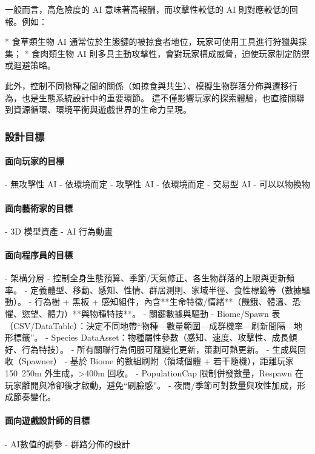 一般而言，高危險度的 AI 意味著高報酬，而攻擊性較低的 AI 則對應較低的回報。例如：

* 食草類生物 AI 通常位於生態鏈的被掠食者地位，玩家可使用工具進行狩獵與採集；
* 食肉類生物 AI 則多具主動攻擊性，會對玩家構成威脅，迫使玩家制定防禦或迴避策略。

此外，控制不同物種之間的關係（如掠食與共生）、模擬生物群落分佈與遷移行為，也是生態系統設計中的重要環節。
這不僅影響玩家的探索體驗，也直接關聯到資源循環、環境平衡與遊戲世界的生命力呈現。

\subsubsection{設計目標}
\paragraph{\Large\bfseries 面向玩家的目標}
\begin{markdown}
- 無攻擊性 AI
  - 依環境而定
- 攻擊性 AI
  - 依環境而定
- 交易型 AI
  - 可以以物換物
\end{markdown}
\paragraph{\Large\bfseries 面向藝術家的目標}
\begin{markdown}
- 3D 模型資產
- AI 行為動畫
\end{markdown}
\paragraph{\Large\bfseries 面向程序員的目標}
\begin{markdown}
- 架構分層
  - 控制全身生態預算、季節/天氣修正、各生物群落的上限與更新頻率。
  - 定義體型、移動、感知、性情、群居測則、家域半徑、食性標籤等（數據驅動）。
  - 行為樹 + 黑板 + 感知組件，內含**生命特徵/情緒**（饑餓、體溫、恐懼、慾望、體力）**與物種特技**。
- 關鍵數據與驅動
  - Biome/Spawn 表（CSV/DataTable）：決定不同地帶“物種—數量範圍—成群機率—刷新間隔—地形標籤”。
  - Species DataAsset：物種屬性參數（感知、速度、攻擊性、成長傾好、行為特技）。
  - 所有關聯行為伺服可隨變化更新，策劃可熱更新。
- 生成與回收（Spawner）
  - 基於 Biome 的數組刷附（領域個體 + 若干隨機），距離玩家 150~250m 外生成，>400m 回收。
  - PopulationCap 限制併發數量，Respawn 在玩家離開與冷卻後才啟動，避免“刷臉感”。
  - 夜間/季節可對數量與攻性加成，形成節奏變化。
\end{markdown}
\paragraph{\Large\bfseries 面向遊戲設計師的目標}
\begin{markdown}
- AI數值的調參
- 群路分佈的設計
\end{markdown}
